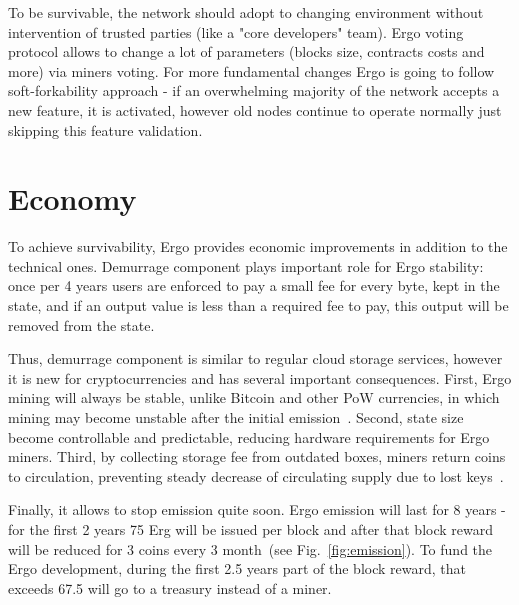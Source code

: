 \documentclass[]{article}
\begin{document}
    To be survivable, the network should adopt to changing environment without intervention of trusted
    parties (like a "core developers" team).
    Ergo voting protocol allows to change a lot of parameters (blocks size, contracts costs and more) via miners voting.
    For more fundamental changes Ergo is going to follow soft-forkability approach -
    if an overwhelming majority of the network accepts a new feature, it is activated,
    however old nodes continue to operate normally just skipping this feature validation.

    \section{Economy}

    To achieve survivability, Ergo provides economic improvements in addition to the technical ones.
    Demurrage component plays important role for Ergo stability:
    once per 4 years users are enforced to pay a small fee for every byte, kept in the state, and
    if an output value is less than a required fee to pay, this output will be removed from the state.

    Thus, demurrage component is similar to regular cloud storage services, however it is new for cryptocurrencies
    and has several important consequences.
    First, Ergo mining will always be stable, unlike Bitcoin and other PoW currencies, in which
    mining may become unstable after the initial emission~\cite{carlsten2016instability}.
    Second, state size become controllable and predictable, reducing hardware requirements
    for Ergo miners.
    Third, by collecting storage fee from outdated boxes, miners return coins to circulation,
    preventing steady decrease of circulating supply due to lost keys~\cite{wsj2018}.

    Finally, it allows to stop emission quite soon.
    Ergo emission will last for 8 years - for the first 2 years 75 Erg will be issued per block
    and after that block reward will be reduced for 3 coins every 3 month~(see Fig.~\ref{fig:emission}).
    To fund the Ergo development, during the first 2.5 years part of the block reward, that
    exceeds 67.5 will go to a treasury instead of a miner.
\end{document}
